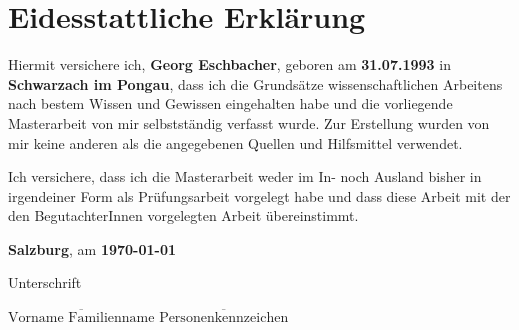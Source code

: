 \section*{Eidesstattliche Erklärung}

Hiermit versichere ich, \textbf{Georg Eschbacher}, geboren am \textbf{31.07.1993} in \textbf{Schwarzach im Pongau}, dass ich die Grundsätze wissenschaftlichen Arbeitens nach bestem Wissen und Gewissen eingehalten habe und die vorliegende Masterarbeit von mir selbstständig verfasst wurde. Zur Erstellung wurden von mir keine anderen als die angegebenen Quellen und Hilfsmittel verwendet.

Ich versichere, dass ich die Masterarbeit weder im In- noch Ausland bisher in irgendeiner Form als Prüfungsarbeit vorgelegt habe und dass diese Arbeit mit der den BegutachterInnen vorgelegten Arbeit übereinstimmt.


\vspace*{3cm}

\textbf{Salzburg}, am \textbf{\today}


\hfill


Unterschrift

\vspace*{1cm}

\hfill \imatrikel\hspace*{1cm}\newline
$\overline{\text{Vorname Familienname}}$ \hfill	$\overline{\text{Personenkennzeichen}}$